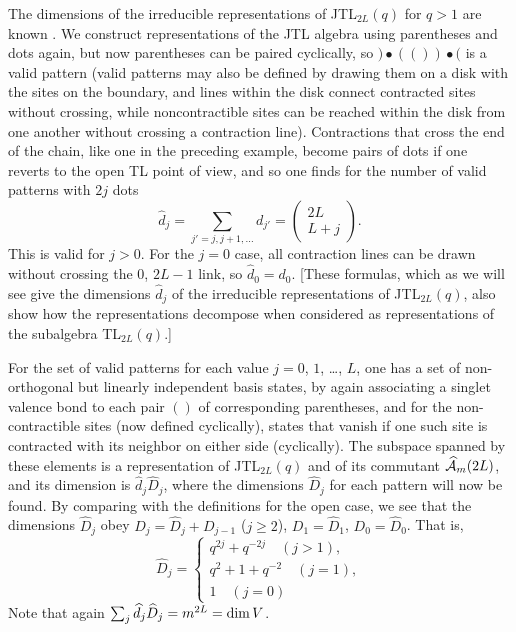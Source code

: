 \documentclass[twocolumn,floats,pra]{revtex4}
\def \hcA {\widehat{\cal A}}
\newcommand {\be}{\begin{equation}}
\newcommand {\ee} {\end{equation}}
\begin{document}
The dimensions of the irreducible representations of JTL$_{2L}(q)$
for $q>1$ are known \cite{jones2}. We construct representations of
the JTL algebra using parentheses and dots again, but now
parentheses can be paired cyclically, so $)\bullet(())\bullet($ is
a valid pattern (valid patterns may also be defined by drawing
them on a disk with the sites on the boundary, and lines within
the disk connect contracted sites without crossing, while
noncontractible sites can be reached within the disk from one
another without crossing a contraction line). Contractions that
cross the end of the chain, like one in the preceding example,
become pairs of dots if one reverts to the open TL point of view,
and so one finds for the number of valid patterns with $2j$ dots
\be%
\widehat{d}_j=\sum_{j'=j,j+1,\ldots} d_{j'}=\left(\begin{array}{c}2L\\
L+j
\end{array}\right). \label{hatdj}\ee
This is valid for $j>0$. For the $j=0$ case, all contraction lines
can be drawn without crossing the $0$, $2L-1$ link, so
$\widehat{d}_0=d_0$. [These formulas, which as we will see give
the dimensions $\widehat{d}_j$ of the irreducible representations
of JTL$_{2L}(q)$, also show how the representations decompose when
considered as representations of the subalgebra TL$_{2L}(q)$.]

For the set of valid patterns for each value $j=0$, $1$, \ldots,
$L$, one has a set of non-orthogonal but linearly independent
basis states, by again associating a singlet valence bond to each
pair $()$ of corresponding parentheses, and for the
non-contractible sites (now defined cyclically), states that
vanish if one such site is contracted with its neighbor on either
side (cyclically). The subspace spanned by these elements is a
representation of JTL$_{2L}(q)$ and of its commutant $\hcA_m(2L)$,
and its dimension is $\widehat{d}_j\widehat{D}_j$, where the
dimensions $\widehat{D}_j$ for each pattern will now be found. By
comparing with the definitions for the open case, we see that the
dimensions $\widehat{D}_j$ obey $D_j=\widehat{D}_j+D_{j-1}$
($j\geq2$),
$D_1=\widehat{D}_1$, $D_0=\widehat{D}_0$. That is,%
\be%
\widehat{D}_j=\left\{\begin{array}{l}q^{2j}+q^{-2j}\quad(j>1),\\
q^2+1+q^{-2}\quad(j=1),\\1\quad(j=0)  \end{array}\right. \ee Note
that again $\sum_j\widehat{d}_j\widehat{D}_j=m^{2L}={\rm dim}\,
V$.
\end{document}
